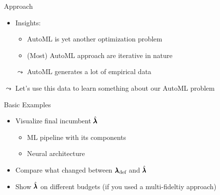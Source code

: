 \begin{frame}[c]{Approach}


\begin{itemize}
	\item \alert{Insights:}
	\begin{itemize}
		\item AutoML is yet another optimization problem
		\item (Most) AutoML approach are iterative in nature 
    \end{itemize}
	\item[$\leadsto$] AutoML generates a lot of empirical data 
\end{itemize}

\begin{center}
\scalebox{0.9}{
	
}
\end{center}

{$\leadsto$ Let's use this data to learn something about our AutoML problem}

\end{frame}
\begin{frame}[c]{Basic Examples}

\begin{itemize}
	\item Visualize final incumbent $\hat{\pmb{\lambda}}$
	\begin{itemize}
		\item ML pipeline with its components
		\item Neural architecture
	\end{itemize}
	\medskip
	\pause
	\item Compare what changed between ${\pmb{\lambda}}_{\text{def}}$ and $\hat{\pmb{\lambda}}$
	\medskip
	\pause		
	\item Show $\hat{\pmb{\lambda}}$ on different budgets (if you used a multi-fideltiy approach)
\end{itemize}

\end{frame}
